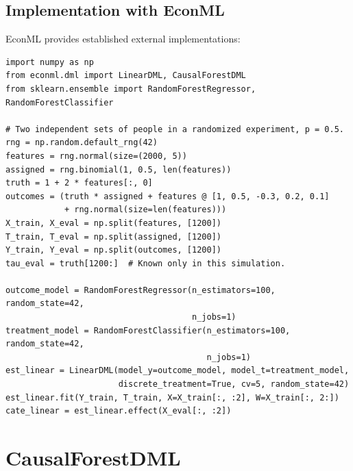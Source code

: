 \subsection{Implementation with EconML}

EconML provides established external implementations:

\begin{verbatim}
import numpy as np
from econml.dml import LinearDML, CausalForestDML
from sklearn.ensemble import RandomForestRegressor, RandomForestClassifier

# Two independent sets of people in a randomized experiment, p = 0.5.
rng = np.random.default_rng(42)
features = rng.normal(size=(2000, 5))
assigned = rng.binomial(1, 0.5, len(features))
truth = 1 + 2 * features[:, 0]
outcomes = (truth * assigned + features @ [1, 0.5, -0.3, 0.2, 0.1]
            + rng.normal(size=len(features)))
X_train, X_eval = np.split(features, [1200])
T_train, T_eval = np.split(assigned, [1200])
Y_train, Y_eval = np.split(outcomes, [1200])
tau_eval = truth[1200:]  # Known only in this simulation.

outcome_model = RandomForestRegressor(n_estimators=100, random_state=42,
                                      n_jobs=1)
treatment_model = RandomForestClassifier(n_estimators=100, random_state=42,
                                         n_jobs=1)
est_linear = LinearDML(model_y=outcome_model, model_t=treatment_model,
                       discrete_treatment=True, cv=5, random_state=42)
est_linear.fit(Y_train, T_train, X=X_train[:, :2], W=X_train[:, 2:])
cate_linear = est_linear.effect(X_eval[:, :2])
\end{verbatim}



\section{CausalForestDML}\label{sec:ch09_causal_forest}

